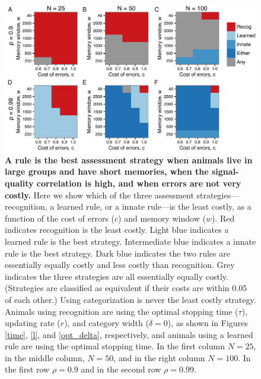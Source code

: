 \begin{figure}
\includegraphics[width=6.85in]{figures/best_type_of_learning.pdf}
\caption{\sffamily\small\textbf{A rule is the best assessment strategy when animals live in large groups and have short memories, when the signal-quality correlation is high, and when errors are not very costly.} Here we show which of the three assessment strategies---recognition, a learned rule, or a innate rule---is the least costly, as a function of the cost of errors ($c$) and memory window ($w$). Red indicates recognition is the least costly. Light blue indicates a learned rule is the best strategy. Intermediate blue indicates a innate rule is the best strategy. Dark blue indicates the two rules are essentially equally costly and less costly than recognition. Grey indicates the three strategies are all essentially equally costly. (Strategies are classified as equivalent if their costs are within $0.05$ of each other.) Using categorization is never the least costly strategy. Animals using recognition are using the optimal stopping time ($\tau$), updating rate ($r$), and category width ($\delta=0$), as shown in Figures \ref{time}, \ref{l}, and \ref{opt_delta}, respectively, and animals using a learned rule are using the optimal stopping time. In the first column $N=25$, in the middle column, $N=50$, and in the right column $N=100$. In the first row $\rho=0.9$ and in the second row $\rho=0.99$.}
\label{best}
\end{figure}

